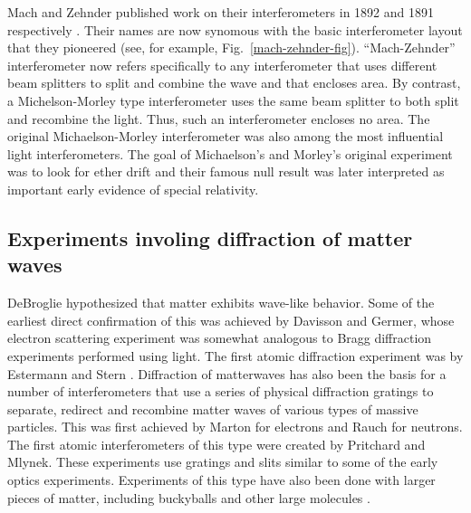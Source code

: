 Mach and Zehnder published work on their interferometers in 1892 and 1891 respectively \cite{mach}\cite{zehnder}. Their names are now synomous with the basic interferometer layout that they pioneered (see, for example, Fig.~\ref{mach-zehnder-fig}).  ``Mach-Zehnder'' interferometer now refers specifically to any interferometer that uses different beam splitters to split and combine the wave and that encloses area. By contrast, a Michelson-Morley type interferometer uses the same beam splitter to both split and recombine the light. Thus, such an interferometer encloses no area. 
The original Michaelson-Morley interferometer was also among the most influential light interferometers. The goal of Michaelson's and Morley's original experiment was to look for ether drift and their famous null result was later interpreted as important early evidence of special relativity.

\subsection{Experiments involing diffraction of matter waves}
DeBroglie hypothesized that matter exhibits wave-like behavior. Some of the earliest direct confirmation of this was achieved by Davisson and Germer\cite{davisson_and_germer}, whose electron scattering experiment was somewhat analogous to Bragg diffraction experiments performed using light. The first atomic diffraction experiment was by Estermann and Stern \cite{esterman_stern}\cite{Kronin_RMP}. Diffraction of matterwaves has also been the basis for a number of interferometers that use a series of physical diffraction gratings to separate, redirect and recombine matter waves of various types of massive particles. This was first achieved by Marton\cite{electronGrating} for electrons and Rauch\cite{neutronGrating} for neutrons. The first atomic interferometers of this type were created by Pritchard\cite{pritchard1991} and Mlynek\cite{youngDoubleSlit_Carnal_Mlynek}. These experiments use gratings and slits similar to some of the early optics experiments. Experiments of this type have also been done with larger pieces of matter, including buckyballs\cite{C60_interferometry} and other large molecules \cite{large_molecule_interferometry}.

